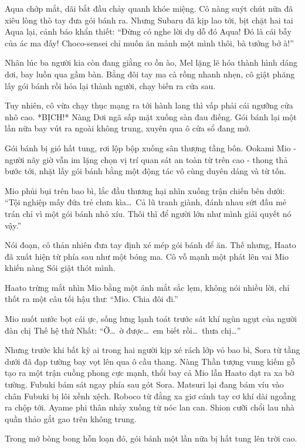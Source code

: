 \documentclass[../main.tex]{subfiles}
\begin{document}
Aqua chớp mắt, dãi bắt đầu chảy quanh khóe miệng. Cô nàng suýt chút nữa đã xiêu lòng thò tay đưa gói bánh ra. Nhưng Subaru đã kịp lao tới, bịt chặt hai tai Aqua lại, cảnh báo khẩn thiết:
``Đừng có nghe lời dụ dỗ đó Aqua! Đó là cái bẫy của ác ma đấy! Choco-sensei chỉ muốn ăn mảnh một mình thôi, bà tưởng bở à!''

Nhân lúc ba người kia còn đang giằng co ồn ào, Mel lặng lẽ hóa thành hình dáng dơi, bay luồn qua gầm bàn. Bằng đôi tay ma cà rồng nhanh nhẹn, cô giật phăng lấy gói bánh rồi hóa lại thành người, chạy biến ra cửa sau.

Tuy nhiên, cô vừa chạy thục mạng ra tới hành lang thì vấp phải cái ngưỡng cửa nhô cao. *BỊCH!* Nàng Dơi ngã sấp mặt xuống sàn đau điếng. Gói bánh lại một lần nữa bay vút ra ngoài không trung, xuyên qua ô cửa sổ đang mở.

Gói bánh bị gió hất tung, rơi lộp bộp xuống sân thượng tầng bốn. Ookami Mio - người nãy giờ vẫn im lặng chọn vị trí quan sát an toàn từ trên cao - thong thả bước tới, nhặt lấy gói bánh bằng một động tác vô cùng duyên dáng và từ tốn.

Mio phủi bụi trên bao bì, lắc đầu thương hại nhìn xuống trận chiến bên dưới:
``Tội nghiệp mấy đứa trẻ chưa kìa\dots\ Cả lũ tranh giành, đánh nhau sứt đầu mẻ trán chỉ vì một gói bánh nhỏ xíu. Thôi thì để người lớn như mình giải quyết nó vậy.''

Nói đoạn, cô thản nhiên đưa tay định xé mép gói bánh để ăn. Thế nhưng, Haato đã xuất hiện từ phía sau như một bóng ma. Cô vỗ mạnh một phát lên vai Mio khiến nàng Sói giật thót mình.

Haato trừng mắt nhìn Mio bằng một ánh mắt sắc lẹm, không nói nhiều lời, chỉ thốt ra một câu tối hậu thư:
``Mio. Chia đôi đi.''

Mio nuốt nước bọt cái ực, sống lưng lạnh toát trước sát khí ngùn ngụt của người đàn chị Thế hệ thứ Nhất:
``Ờ\dots\ ờ được\dots\ em biết rồi\dots\ thưa chị\dots''

Nhưng trước khi bất kỳ ai trong hai người kịp xé rách lớp vỏ bao bì, Sora từ tầng dưới đã đạp tường bay vọt lên qua ô cầu thang. Nàng Thần tượng vung kiếm gỗ tạo ra một trận cuồng phong cực mạnh, thổi bay cả Mio lẫn Haato dạt ra xa bờ tường. Fubuki bám sát ngay phía sau gót Sora. Matsuri lại đang bám víu vào chân Fubuki bị lôi xềnh xệch. Roboco từ đằng xa giơ cánh tay cơ khí dài ngoẵng ra chộp tới. Ayame phi thân nhảy xuống từ nóc lan can. Shion cưỡi chổi lau nhà quần thảo gắt gao trên không trung.

Trong mớ bòng bong hỗn loạn đó, gói bánh một lần nữa bị hất tung lên trời cao.
\end{document}
